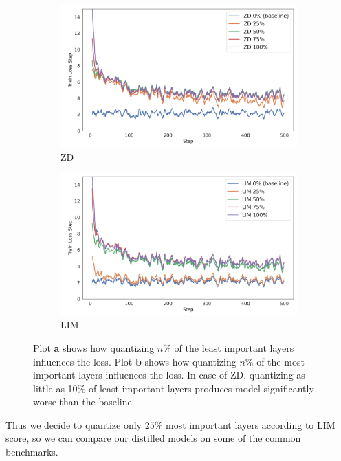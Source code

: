 \documentclass{article}
\begin{document}
\begin{figure}[ht]
  \centering
  \begin{subfigure}[b]{0.45\textwidth}
    \includegraphics[width=\linewidth]{../data/plots/ZD_least_important.png}
    \caption{ZD}
  \end{subfigure}
  \hfill
  \begin{subfigure}[b]{0.45\textwidth}
    \includegraphics[width=\linewidth]{../data/plots/LIM_most_important.png}
    \caption{LIM}
  \end{subfigure}
  \vspace{0.5em}
  \caption{Plot \textbf{a} shows how quantizing \(n\%\) of the least important layers influences the loss. Plot \textbf{b} shows how quantizing \(n\%\) of the most important layers influences the loss. In case of ZD, quantizing as little as 10\% of least important layers produces model significantly worse than the baseline.
  }
  \label{fig:layers}
\end{figure}

Thus we decide to quantize only \(25\%\) most important layers according to LIM score, so we can compare our distilled models on some of the common benchmarks.
\end{document}
